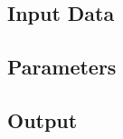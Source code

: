 \documentclass[TechnicalNoteMeteo.tex]{subfiles}
\begin{document}
\subsection{Input Data}

\subsection{Parameters}\label{sec:parameters}

\subsection{Output}\label{sec:output}
\end{document}
